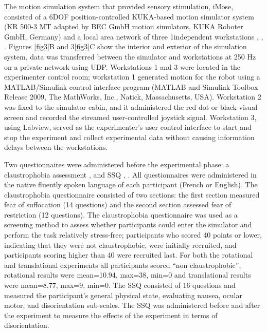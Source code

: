 \indent The motion simulation system that provided sensory stimulation, iMose, consisted of a 6DOF position-controlled KUKA-based motion simulator system (KR 500-3 MT adapted by BEC GmbH motion simulators, KUKA Roboter GmbH, Germany) and a local area network of three 1independent workstations \cite{Denquin_2021_LAF}, \cite{Landrieu_2017_Timetocollision}, \cite{Bellmann_2011_DLR}. Figures \ref{fig3}B and 3\ref{fig3}C show the interior and exterior of the simulation system, data was transferred between the simulator and workstations at 250 Hz on a private network using UDP. Workstations 1 and 3 were located in the experimenter control room; workstation 1 generated motion for the robot using a MATLAB/Simulink control interface program (MATLAB and Simulink Toolbox Release 2009, The MathWorks, Inc., Natick, Massachusetts, USA). Workstation 2 was fixed to the simulator cabin, and it administered the red dot or black visual screen and recorded the streamed user-controlled joystick signal. Workstation 3, using Labview, served as the experimenter’s user control interface to start and stop the experiment and collect experimental data without causing information delays between the workstations.

\indent Two questionnaires were administered before the experimental phase: a claustrophobia assessment \cite{Radomsky_2001_Claustrophobia}, \cite{Radomsky_2006_Claustrophobia_CLQ} and SSQ \cite{Kennedy_1993_Simulator}, \cite{Bouchard_2007_SimulatorSickness}. All questionnaires were administered in the native fluently spoken language of each participant (French or English). The claustrophobia questionnaire consisted of two sections: the first section measured fear of suffocation (14 questions) and the second section assessed fear of restriction (12 questions). The claustrophobia questionnaire was used as a screening method to assess whether participants could enter the simulator and perform the task relatively stress-free; participants who scored 40 points or lower, indicating that they were not claustrophobic, were initially recruited, and participants scoring higher than 40 were recruited last. For both the rotational and translational experiments all participants scored “non-claustrophobic”, rotational results were mean=10.94, max=38, min=0 and translational results were mean=8.77, max=9, min=0. The SSQ consisted of 16 questions and measured the participant’s general physical state, evaluating nausea, ocular motor, and disorientation sub-scales. The SSQ was administered before and after the experiment to measure the effects of the experiment in terms of disorientation.
